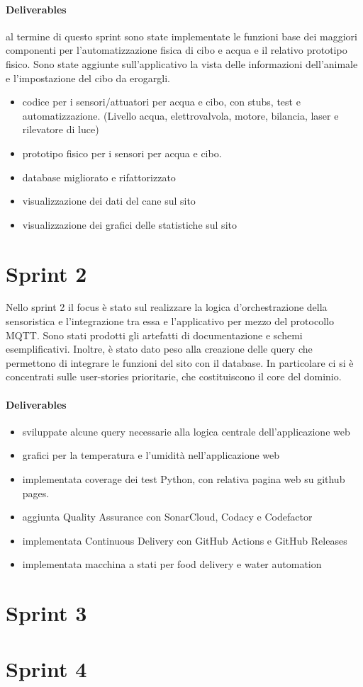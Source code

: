 \paragraph{Deliverables}
al termine di questo sprint sono state implementate le funzioni base dei maggiori componenti per l'automatizzazione fisica di cibo e acqua e il relativo prototipo fisico. Sono state aggiunte sull'applicativo la vista delle informazioni dell'animale e l'impostazione del cibo da erogargli. 
\begin{itemize}
    \item codice per i sensori/attuatori per acqua e cibo, con stubs, test e automatizzazione. (Livello acqua, elettrovalvola, motore, bilancia, laser e rilevatore di luce)
    \item prototipo fisico per i sensori per acqua e cibo. 
    \item database migliorato e rifattorizzato
    \item visualizzazione dei dati del cane sul sito 
    \item visualizzazione dei grafici delle statistiche sul sito 
\end{itemize}

\section{Sprint 2}
Nello sprint 2 il focus è stato sul realizzare la logica d'orchestrazione della sensoristica e l'integrazione tra essa e l'applicativo per mezzo del protocollo MQTT. Sono stati prodotti gli artefatti di documentazione e schemi esemplificativi. Inoltre, è stato dato peso alla creazione delle query che permettono di integrare le funzioni del sito con il database. In particolare ci si è concentrati sulle user-stories prioritarie, che costituiscono il core del dominio.
\paragraph{Deliverables}
\begin{itemize}
    \item sviluppate alcune query necessarie alla logica centrale dell'applicazione web
    \item grafici per la temperatura e l'umidità nell'applicazione web
    \item implementata coverage dei test Python, con relativa pagina web su github pages. 
    \item aggiunta Quality Assurance con SonarCloud, Codacy e Codefactor
    \item implementata Continuous Delivery con GitHub Actions e GitHub Releases
    \item implementata macchina a stati per food delivery e water automation
\end{itemize}

\section{Sprint 3}


\section{Sprint 4}


